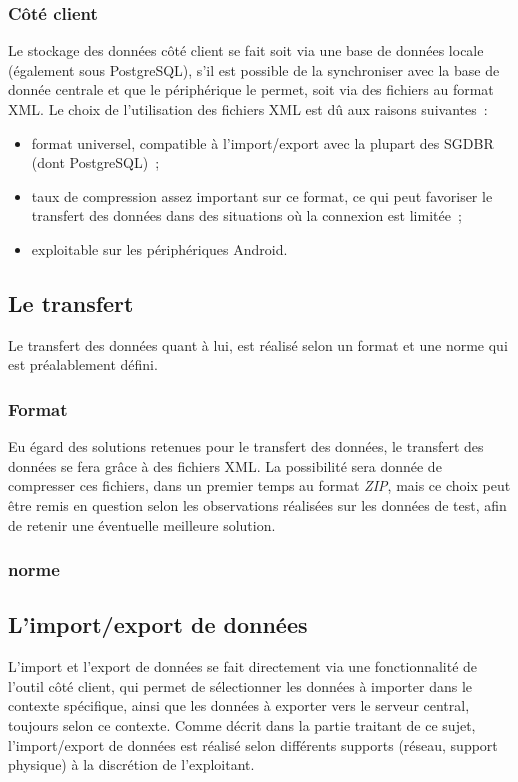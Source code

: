 \subsubsection{Côté client}
Le stockage des données côté client se fait soit via une base de données locale (également sous PostgreSQL), s'il est possible de la synchroniser avec la base de donnée centrale et que le périphérique le permet, soit via des fichiers au format XML.
Le choix de l'utilisation des fichiers XML est dû aux raisons suivantes~:
\begin{itemize}
	\item format universel, compatible à l'import/export avec la plupart des SGDBR (dont PostgreSQL)~;
	\item taux de compression assez important sur ce format, ce qui peut favoriser le transfert des données dans des situations où la connexion est limitée~;
	\item exploitable sur les périphériques Android.
\end{itemize}

\subsection{Le transfert}
Le transfert des données quant à lui, est réalisé selon un format et une norme qui est préalablement défini.

\subsubsection{Format}
Eu égard des solutions retenues pour le transfert des données, le transfert des données se fera grâce à des fichiers XML.
La possibilité sera donnée de compresser ces fichiers, dans un premier temps au format \emph{ZIP}, mais ce choix peut être remis en question selon les observations réalisées sur les données de test, afin de retenir une éventuelle meilleure solution.

\subsubsection{norme}
% 
% 

\subsection{L'import/export de données}
L'import et l'export de données se fait directement via une fonctionnalité de l'outil côté client, qui permet de sélectionner les données à importer dans le contexte spécifique, ainsi que les données à exporter vers le serveur central, toujours selon ce contexte.
Comme décrit dans la partie traitant de ce sujet, l'import/export de données est réalisé selon différents supports (réseau, support physique) à la discrétion de l'exploitant.

